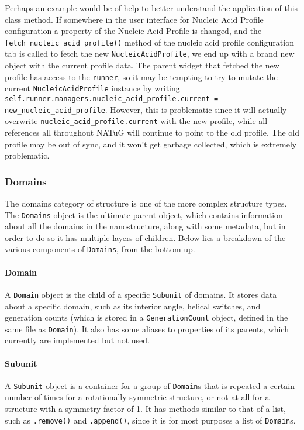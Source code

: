 \documentclass[titlepage]{article}
\begin{document}
	Perhaps an example would be of help to better understand the application of this class method. If somewhere in the user interface for Nucleic Acid Profile configuration a property of the Nucleic Acid Profile is changed, and the \texttt{fetch\_nucleic\_acid\_profile()} method of the nucleic acid profile configuration tab is called to fetch the new \texttt{NucleicAcidProfile}, we end up with a brand new object with the current profile data. The parent widget that fetched the new profile has access to the \texttt{runner}, so it may be tempting to try to mutate the current \texttt{NucleicAcidProfile} instance by writing \texttt{self.runner.managers.nucleic\_acid\_profile.current = new\_nucleic\_acid\_profile}. However, this is problematic since it will actually overwrite \texttt{nucleic\_acid\_profile.current} with the new profile, while all references all throughout NATuG will continue to point to the old profile. The old profile may be out of sync, and it won't get garbage collected, which is extremely problematic.
	
	\subsubsection{Domains}
	The domains category of structure is one of the more complex structure types. The \texttt{Domains} object is the ultimate parent object, which contains information about all the domains in the nanostructure, along with some metadata, but in order to do so it has multiple layers of children. Below lies a breakdown of the various components of \texttt{Domains}, from the bottom up.
	
	\paragraph{Domain}
	A \texttt{Domain} object is the child of a specific \texttt{Subunit} of domains. It stores data about a specific domain, such as its interior angle, helical switches, and generation counts (which is stored in a \texttt{GenerationCount} object, defined in the same file as \texttt{Domain}). It also has some aliases to properties of its parents, which currently are implemented but not used.
	
	\paragraph{Subunit}
	A \texttt{Subunit} object is a container for a group of \texttt{Domain}s that is repeated a certain number of times for a rotationally symmetric structure, or not at all for a structure with a symmetry factor of 1. It has methods similar to that of a list, such as \texttt{.remove()} and \texttt{.append()}, since it is for most purposes a list of \texttt{Domain}s.
	
\end{document}
